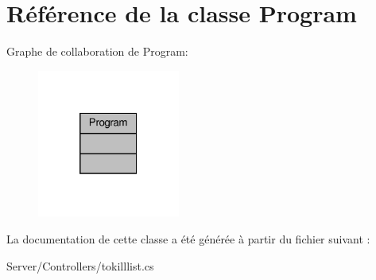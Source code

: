 \hypertarget{class_program}{}\section{Référence de la classe Program}
\label{class_program}


Graphe de collaboration de Program\+:
\nopagebreak
\begin{figure}[H]
\begin{center}
\leavevmode
\includegraphics[width=133pt]{class_program__coll__graph}
\end{center}
\end{figure}


La documentation de cette classe a été générée à partir du fichier suivant \+:\begin{DoxyCompactItemize}
\item 
Server/\+Controllers/tokilllist.\+cs\end{DoxyCompactItemize}
